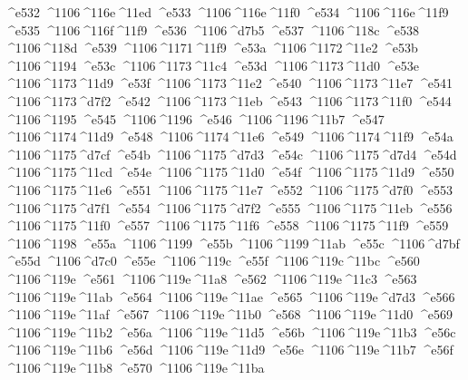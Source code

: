 \checkit ^^^^e532 ^^^^1106^^^^116e^^^^11ed
\checkit ^^^^e533 ^^^^1106^^^^116e^^^^11f0
\checkit ^^^^e534 ^^^^1106^^^^116e^^^^11f9
\checkit ^^^^e535 ^^^^1106^^^^116f^^^^11f9
\checkit ^^^^e536 ^^^^1106^^^^d7b5
\checkit ^^^^e537 ^^^^1106^^^^118c
\checkit ^^^^e538 ^^^^1106^^^^118d
\checkit ^^^^e539 ^^^^1106^^^^1171^^^^11f9
\checkit ^^^^e53a ^^^^1106^^^^1172^^^^11e2
\checkit ^^^^e53b ^^^^1106^^^^1194
\checkit ^^^^e53c ^^^^1106^^^^1173^^^^11c4
\checkit ^^^^e53d ^^^^1106^^^^1173^^^^11d0
\checkit ^^^^e53e ^^^^1106^^^^1173^^^^11d9
\checkit ^^^^e53f ^^^^1106^^^^1173^^^^11e2
\checkit ^^^^e540 ^^^^1106^^^^1173^^^^11e7
\checkit ^^^^e541 ^^^^1106^^^^1173^^^^d7f2
\checkit ^^^^e542 ^^^^1106^^^^1173^^^^11eb
\checkit ^^^^e543 ^^^^1106^^^^1173^^^^11f0
\checkit ^^^^e544 ^^^^1106^^^^1195
\checkit ^^^^e545 ^^^^1106^^^^1196
\checkit ^^^^e546 ^^^^1106^^^^1196^^^^11b7
\checkit ^^^^e547 ^^^^1106^^^^1174^^^^11d9
\checkit ^^^^e548 ^^^^1106^^^^1174^^^^11e6
\checkit ^^^^e549 ^^^^1106^^^^1174^^^^11f9
\checkit ^^^^e54a ^^^^1106^^^^1175^^^^d7cf
\checkit ^^^^e54b ^^^^1106^^^^1175^^^^d7d3
\checkit ^^^^e54c ^^^^1106^^^^1175^^^^d7d4
\checkit ^^^^e54d ^^^^1106^^^^1175^^^^11cd
\checkit ^^^^e54e ^^^^1106^^^^1175^^^^11d0
\checkit ^^^^e54f ^^^^1106^^^^1175^^^^11d9
\checkit ^^^^e550 ^^^^1106^^^^1175^^^^11e6
\checkit ^^^^e551 ^^^^1106^^^^1175^^^^11e7
\checkit ^^^^e552 ^^^^1106^^^^1175^^^^d7f0
\checkit ^^^^e553 ^^^^1106^^^^1175^^^^d7f1
\checkit ^^^^e554 ^^^^1106^^^^1175^^^^d7f2
\checkit ^^^^e555 ^^^^1106^^^^1175^^^^11eb
\checkit ^^^^e556 ^^^^1106^^^^1175^^^^11f0
\checkit ^^^^e557 ^^^^1106^^^^1175^^^^11f6
\checkit ^^^^e558 ^^^^1106^^^^1175^^^^11f9
\checkit ^^^^e559 ^^^^1106^^^^1198
\checkit ^^^^e55a ^^^^1106^^^^1199
\checkit ^^^^e55b ^^^^1106^^^^1199^^^^11ab
\checkit ^^^^e55c ^^^^1106^^^^d7bf
\checkit ^^^^e55d ^^^^1106^^^^d7c0
\checkit ^^^^e55e ^^^^1106^^^^119c
\checkit ^^^^e55f ^^^^1106^^^^119c^^^^11bc
\checkit ^^^^e560 ^^^^1106^^^^119e
\checkit ^^^^e561 ^^^^1106^^^^119e^^^^11a8
\checkit ^^^^e562 ^^^^1106^^^^119e^^^^11c3
\checkit ^^^^e563 ^^^^1106^^^^119e^^^^11ab
\checkit ^^^^e564 ^^^^1106^^^^119e^^^^11ae
\checkit ^^^^e565 ^^^^1106^^^^119e^^^^d7d3
\checkit ^^^^e566 ^^^^1106^^^^119e^^^^11af
\checkit ^^^^e567 ^^^^1106^^^^119e^^^^11b0
\checkit ^^^^e568 ^^^^1106^^^^119e^^^^11d0
\checkit ^^^^e569 ^^^^1106^^^^119e^^^^11b2
\checkit ^^^^e56a ^^^^1106^^^^119e^^^^11d5
\checkit ^^^^e56b ^^^^1106^^^^119e^^^^11b3
\checkit ^^^^e56c ^^^^1106^^^^119e^^^^11b6
\checkit ^^^^e56d ^^^^1106^^^^119e^^^^11d9
\checkit ^^^^e56e ^^^^1106^^^^119e^^^^11b7
\checkit ^^^^e56f ^^^^1106^^^^119e^^^^11b8
\checkit ^^^^e570 ^^^^1106^^^^119e^^^^11ba
